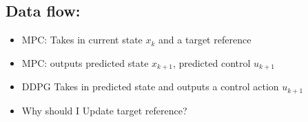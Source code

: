 \documentclass[11pt]{article}
\begin{document}
\subsection{Data flow:}
\label{sec:orgd712193}

\begin{itemize}
    \item MPC: Takes in current state $x_k$ and a target reference
    \item MPC: outputs predicted state $x_{k+1}$, predicted control $u_{k+1}$
    \item DDPG Takes in predicted state and outputs a control action $u_{k+1}$
    \item Why should I Update target reference?
\end{itemize}
\end{document}
